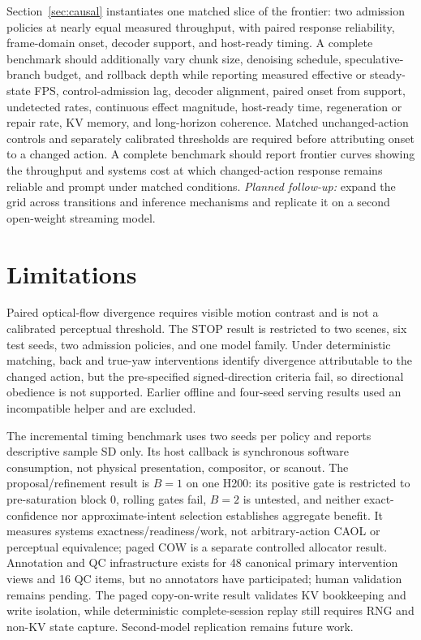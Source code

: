 \documentclass[11pt]{article}
\newcommand{\planned}[1]{\emph{Planned follow-up:} #1}
\newcommand{\caol}{CAOL}
\begin{document}
Section~\ref{sec:causal} instantiates one matched slice of the frontier: two admission policies at nearly equal measured throughput, with paired response reliability, frame-domain onset, decoder support, and host-ready timing. A complete benchmark should additionally vary chunk size, denoising schedule, speculative-branch budget, and rollback depth while reporting measured effective or steady-state FPS, control-admission lag, decoder alignment, paired onset from support, undetected rates, continuous effect magnitude, host-ready time, regeneration or repair rate, KV memory, and long-horizon coherence. Matched unchanged-action controls and separately calibrated thresholds are required before attributing onset to a changed action. A complete benchmark should report frontier curves showing the throughput and systems cost at which changed-action response remains reliable and prompt under matched conditions. \planned{expand the grid across transitions and inference mechanisms and replicate it on a second open-weight streaming model.}

\section{Limitations}
\label{sec:limits}

Paired optical-flow divergence requires visible motion contrast and is not a calibrated perceptual threshold. The STOP result is restricted to two scenes, six test seeds, two admission policies, and one model family. Under deterministic matching, back and true-yaw interventions identify divergence attributable to the changed action, but the pre-specified signed-direction criteria fail, so directional obedience is not supported. Earlier offline and four-seed serving results used an incompatible helper and are excluded.

The incremental timing benchmark uses two seeds per policy and reports descriptive sample SD only. Its host callback is synchronous software consumption, not physical presentation, compositor, or scanout. The proposal/refinement result is $B=1$ on one H200: its positive gate is restricted to pre-saturation block 0, rolling gates fail, $B=2$ is untested, and neither exact-confidence nor approximate-intent selection establishes aggregate benefit. It measures systems exactness/readiness/work, not arbitrary-action \caol{} or perceptual equivalence; paged COW is a separate controlled allocator result. Annotation and QC infrastructure exists for 48 canonical primary intervention views and 16 QC items, but no annotators have participated; human validation remains pending. The paged copy-on-write result validates KV bookkeeping and write isolation, while deterministic complete-session replay still requires RNG and non-KV state capture. Second-model replication remains future work.
\end{document}
